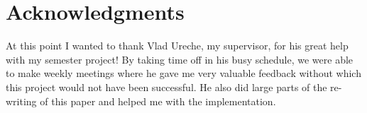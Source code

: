 \section{Acknowledgments}

At this point I wanted to thank Vlad Ureche, my supervisor, for his great help with my semester project! By taking time off in his busy schedule, we were able to make weekly meetings where he gave me very valuable feedback without which this project would not have been successful. He also did large parts of the re-writing of this paper and helped me with the implementation.